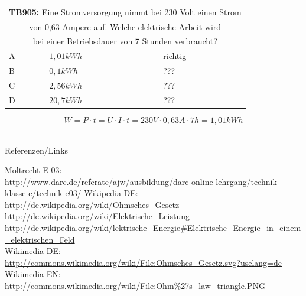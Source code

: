 \begin{frame}
	\begin{small}	
	\begin{tabular}{|l|l|l|}
	\hline
		\multicolumn{3}{|c|}{\textbf{TB905:} Eine Stromversorgung nimmt bei 230 Volt einen Strom }\\
		\multicolumn{3}{|c|}{von 0,63 Ampere auf. Welche elektrische Arbeit  wird }\\
		\multicolumn{3}{|c|}{bei einer Betriebsdauer von 7 Stunden verbraucht?}\\
		\hline
		A & $1,01 kWh$ & richtig \\ \hline
		B & $0,1 kWh $ & ??? \\ \hline
		C & $2,56 kWh$ & ??? \\ \hline
		D & $20,7 kWh$ & ??? \\ \hline	
	\end{tabular}
	\end{small}
	\vspace{1cm}
	\begin{equation}
		W = P \cdot t = U \cdot I \cdot t = 230V \cdot 0,63A \cdot 7h = 1,01kWh
	\end{equation}
\end{frame}

\renewcommand{\refname}{Referenzen}

\hypertarget{refs}{}
\textcolor{white}{} \\ %
\Large Referenzen/Links
\footnotesize

\begin{thebibliography}{}
       Moltrecht E 03: \\
                    \url{http://www.darc.de/referate/ajw/ausbildung/darc-online-lehrgang/technik-klasse-e/technik-e03/}
        Wikipedia DE: \\
                    \url{http://de.wikipedia.org/wiki/Ohmsches_Gesetz}\\ 
                    \url{http://de.wikipedia.org/wiki/Elektrische_Leistung}\\ 
                    \url{http://de.wikipedia.org/wiki/lektrische_Energie#Elektrische_Energie_in_einem_elektrischen_Feld}\\ 
    	Wikimedia DE:\\
    				\url{http://commons.wikimedia.org/wiki/File:Ohmsches_Gesetz.svg?uselang=de}\\
   		Wikimedia EN:\\
   					\url{http://commons.wikimedia.org/wiki/File:Ohm\%27s_law_triangle.PNG}\\
\end{thebibliography} 


